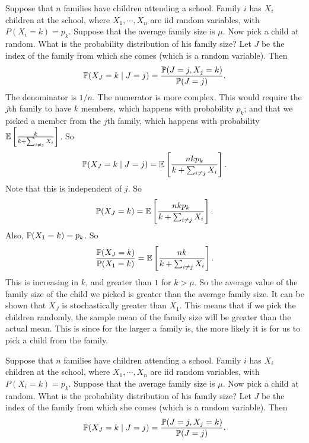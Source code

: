 \begin{note}
  \begin{field}
    \begin{eg}
      Suppose that $n$ families have children attending a school. Family $i$ has $X_i$ children at the school, where $X_1, \cdots, X_n$ are iid random variables, with $P(X_i = k) = p_k$. Suppose that the average family size is $\mu$.
      Now pick a child at random. What is the probability distribution of his family size? Let $J$ be the index of the family from which she comes (which is a random variable). Then
      \[
        \P(X_J = k\mid J = j) = \frac{\P(J = j, X_j = k)}{\P(J = j)}.
      \]
      The denominator is $1/n$. The numerator is more complex. This would require the $j$th family to have $k$ members, which happens with probability $p_k$; and that we picked a member from the $j$th family, which happens with probability $\E\left[\frac{k}{k + \sum_{i \not=j} X_i}\right]$. So
      \[
        \P(X_J = k \mid J = j) = \E\left[\frac{nkp_k}{k + \sum_{i \not=j} X_i}\right].
      \]
      Note that this is independent of $j$. So
      \[
        \P(X_J = k) = \E\left[\frac{nkp_k}{k + \sum_{i \not=j} X_i}\right].
      \]
      Also, $\P(X_1 = k) = p_k$. So
      \[
        \frac{\P(X_J = k)}{\P(X_1 = k)} = \E\left[\frac{nk}{k + \sum_{i \not= j}X_i}\right].
      \]
      This is increasing in $k$, and greater than $1$ for $k > \mu$. So the average value of the family size of the child we picked is greater than the average family size. It can be shown that $X_J$ is stochastically greater than $X_1$.
      This means that if we pick the children randomly, the sample mean of the family size will be greater than the actual mean. This is since for the larger a family is, the more likely it is for us to pick a child from the family.
    \end{eg}
  \end{field}
  \begin{field}
    \begin{eg}
      Suppose that $n$ families have children attending a school. Family $i$ has $X_i$ children at the school, where $X_1, \cdots, X_n$ are iid random variables, with $P(X_i = k) = p_k$. Suppose that the average family size is $\mu$.
      Now pick a child at random. What is the probability distribution of his family size? Let $J$ be the index of the family from which she comes (which is a random variable). Then
      \[
        \P(X_J = k\mid J = j) = \frac{\P(J = j, X_j = k)}{\P(J = j)}.
\]
\end{eg}
\end{field}
\end{note}
